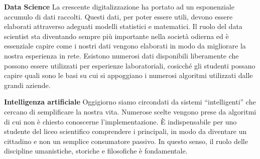 \textbf{Data Science} La crescente digitalizzazione ha portato ad un esponenziale accumulo di dati raccolti. Questi dati, per poter essere utili, devono essere elaborati attraverso adeguati modelli statistici e matematici. Il ruolo del data scientist sta diventando sempre più importante nella società odierna ed è essenziale capire come i nostri dati vengono elaborati in modo da migliorare la nostra esperienza in rete. Esistono numerosi dati disponibili liberamente che possono essere utilizzati per esperienze laboratoriali, cosicché gli studenti possano capire quali sono le basi su cui si appoggiano i numerosi algoritmi utilizzati dalle grandi aziende.

\textbf{Intelligenza artificiale} Oggigiorno siamo circondati da sistemi “intelligenti” che cercano di semplificare la nostra vita. Numerose scelte vengono prese da algoritmi di cui non è chiesto conoscerne l’implementazione. È indispensabile per uno studente del liceo scientifico comprendere i principali, in modo da diventare un cittadino e non un semplice consumatore passivo.  In questo senso, il ruolo delle discipline umanistiche, storiche e filosofiche è fondamentale.


